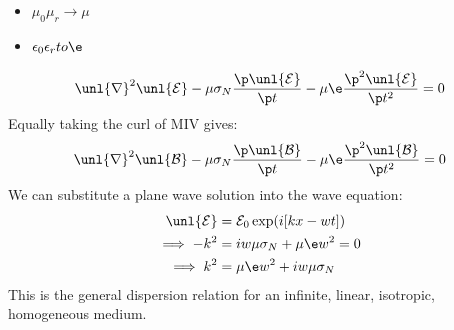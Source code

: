 \documentclass[a4paper, 11pt, normalem]{report}
\renewcommand\E{\mathcal{E}}
\newcommand\uE{\unl{\E}}
\renewcommand\B{\mathcal{B}}
\newcommand\uB{\unl{\B}}
\renewcommand\del{\unl{\nabla}}
\newcommand\eno{\epsilon_0}
\newcommand\er{\epsilon_r}
\begin{document}
\chapter{}

\begin{itemize}
    \item $\mu_0\mu_r \to \mu$
    \item $\eno\er to \e$
\end{itemize}
\begin{equation}
    \del^2\uE - \mu\sigma_N\frac{\p \uE}{\p t} - \mu\e\frac{\p^2\uE}{\p t^2} = 0
\end{equation}
Equally taking the curl of M\RN{4} gives:
\begin{equation}
    \del^2\uB - \mu\sigma_N \frac{\p \uB}{\p t} - \mu\e\frac{\p^2\uB}{\p t^2} = 0
\end{equation}
We can substitute a plane wave solution into the wave equation:
\begin{align}
    \uE &= \E_0 \exp(i[kx - wt]) \\
    \implies -k^2 &= iw\mu\sigma_N + \mu\e w^2 = 0 \\
    \implies k^2 &= \mu\e w^2 + iw\mu\sigma_N
\end{align}
This is the general dispersion relation for an infinite, linear, isotropic, homogeneous medium.
\end{document}
